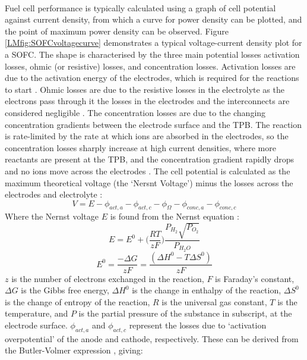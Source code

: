     \hspace{1cm}\\
    Fuel cell performance is typically calculated using a graph of cell potential against current density, from which a curve for power density can be plotted, and the point of maximum power density can be observed. Figure \ref{LMfig:SOFCvoltagecurve} demonstrates a typical voltage-current density plot for a SOFC. The shape is characterised by the three main potential losses \text{-} activation losses, ohmic (or resistive) losses, and concentration losses. Activation losses are due to the activation energy of the electrodes, which is required for the reactions to start \cite{LM2}. Ohmic losses are due to the resistive losses in the electrolyte as the electrons pass through it \text{-} the losses in the electrodes and the interconnects are considered negligible \cite{LM4}. The concentration losses are due to the changing concentration gradients between the electrode surface and the TPB. The reaction is rate-limited by the rate at which ions are absorbed in the electrodes, so the concentration losses sharply increase at high current densities, where more reactants are present at the TPB, and the concentration gradient rapidly drops and no ions move across the electrodes \cite{LM2}.
 The cell potential is calculated as the maximum theoretical voltage (the `Nersnt Voltage') minus the losses across the electrodes and electrolyte \cite{LM5}:
\begin{equation}
    V=E- \phi_{act,a} - \phi_{act,c}-  \phi_{\Omega}- \phi_{conc,a} -  \phi_{conc,c}
\end{equation}
Where the Nernst voltage $E$ is found from the Nernst equation \cite{LM2}:
\begin{equation}
E= E^0+  \Big (\frac{RT}{zF} \Big )  \frac{P_{H_{2}} \sqrt{P_{O_{2}} }}{P_{H_{2}O} }
\end{equation}
\begin{equation}
E^0=  \frac{-\Delta G}{zF} =  \frac{(\Delta H^0-T \Delta S^0)}{zF} 					
\end{equation}
$z$ is the number of electrons exchanged in the reaction, $F$ is Faraday's constant, $\Delta G$ is the Gibbs free energy, $\Delta H^{0}$ is the change in enthalpy of the reaction, $\Delta S^{0}$ is the change of entropy of the reaction, $R$ is the universal gas constant, $T$ is the temperature, and $P$ is the partial pressure of the substance in subscript, at the electrode surface. 
$\phi_{act,a}$ and $\phi_{act,c}$ represent the losses due to `activation overpotential' of the anode and cathode, respectively. These can be derived from the Butler-Volmer expression \cite{LM3}, giving:
